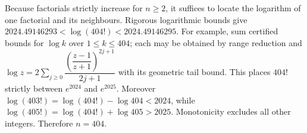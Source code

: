Because factorials strictly increase for $n\ge2$, it suffices to locate the logarithm of one factorial and its neighbours. Rigorous logarithmic bounds give $2024.49146293<\log(404!)<2024.49146295$. For example, sum certified bounds for $\log k$ over $1\le k\le404$; each may be obtained by range reduction and $\log z = 2 \sum_{j\ge0} \dfrac{(\dfrac{z-1}{z+1})^{2j+1}}{2j+1}$ with its geometric tail bound. This places $404!$ strictly between $e^{2024}$ and $e^{2025}$. Moreover $\log(403!)=\log(404!)-\log404<2024$, while $\log(405!)=\log(404!)+\log405>2025$. Monotonicity excludes all other integers. Therefore $\boxed{n=404}$.
